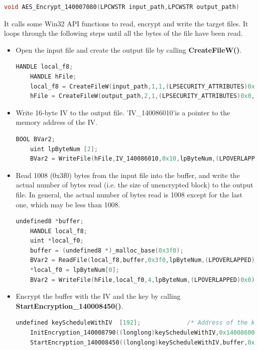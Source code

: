 \documentclass[11pt]{article}
\begin{document}
\begin{lstlisting}[language=c++]
void AES_Encrypt_140007080(LPCWSTR input_path,LPCWSTR output_path)
\end{lstlisting}

It calls some Win32 API functions to read, encrypt and write the target files. It loops through the following steps until all the bytes of the file have been read.

\begin{itemize}
  \item Open the input file and create the output file by calling \textbf{CreateFileW()}.
  \begin{lstlisting}[language=c++]
    HANDLE local_f8;
    HANDLE hFile;
    local_f8 = CreateFileW(input_path,1,1,(LPSECURITY_ATTRIBUTES)0x0,3,0x80,(HANDLE)0x0);
    hFile = CreateFileW(output_path,2,1,(LPSECURITY_ATTRIBUTES)0x0,4,0x80(HANDLE)0x0);\end{lstlisting}
  
  \item Write 16-byte IV to the output file. 'IV\_140086010'is a pointer to the memory address of the IV.
  \begin{lstlisting}[language=c++]
    BOOL BVar2;
    uint lpByteNum [2];
    BVar2 = WriteFile(hFile,IV_140086010,0x10,lpByteNum,(LPOVERLAPPED)0x0)\end{lstlisting}

  \item Read 1008 (0x3f0) bytes from the input file into the buffer, and write the actual number of bytes read (i.e. the size of unencrypted block) to the output file. In general, the actual number of bytes read is 1008 except for the last one, which may be less than 1008.
  \begin{lstlisting}[language=c++]
    undefined8 *buffer;
    HANDLE local_f8;
    uint *local_f0;
    buffer = (undefined8 *)_malloc_base(0x3f0);
    BVar2 = ReadFile(local_f8,buffer,0x3f0,lpByteNum,(LPOVERLAPPED)0x0);
    *local_f0 = lpByteNum[0];
    BVar2 = WriteFile(hFile,local_f0,4,lpByteNum,(LPOVERLAPPED)0x0);\end{lstlisting}

  \item Encrypt the buffer with the IV and the key by calling \textbf{StartEncryption\_140008450()}.
  \begin{lstlisting}[language=c++]
    undefined keyScheduleWithIV  [192];             /* Address of the key*/
    InitEncryption_140008790((longlong)keyScheduleWithIV,0x140086000,(undefined8 *)IV_140086010);
    StartEncryption_140008450((longlong)keyScheduleWithIV,buffer,0x3f0);\end{lstlisting}


\end{itemize}
\end{document}
